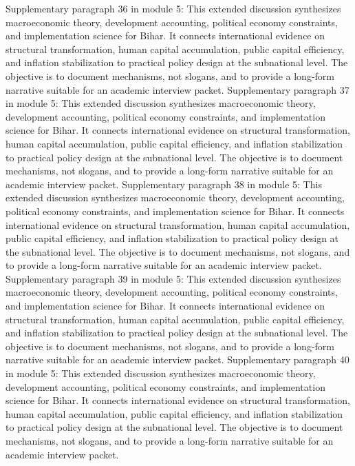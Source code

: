 \documentclass[preprint,12pt]{elsarticle}
\begin{document}
Supplementary paragraph 36 in module 5: This extended discussion synthesizes macroeconomic theory, development accounting, political economy constraints, and implementation science for Bihar. It connects international evidence on structural transformation, human capital accumulation, public capital efficiency, and inflation stabilization to practical policy design at the subnational level. The objective is to document mechanisms, not slogans, and to provide a long-form narrative suitable for an academic interview packet.
Supplementary paragraph 37 in module 5: This extended discussion synthesizes macroeconomic theory, development accounting, political economy constraints, and implementation science for Bihar. It connects international evidence on structural transformation, human capital accumulation, public capital efficiency, and inflation stabilization to practical policy design at the subnational level. The objective is to document mechanisms, not slogans, and to provide a long-form narrative suitable for an academic interview packet.
Supplementary paragraph 38 in module 5: This extended discussion synthesizes macroeconomic theory, development accounting, political economy constraints, and implementation science for Bihar. It connects international evidence on structural transformation, human capital accumulation, public capital efficiency, and inflation stabilization to practical policy design at the subnational level. The objective is to document mechanisms, not slogans, and to provide a long-form narrative suitable for an academic interview packet.
Supplementary paragraph 39 in module 5: This extended discussion synthesizes macroeconomic theory, development accounting, political economy constraints, and implementation science for Bihar. It connects international evidence on structural transformation, human capital accumulation, public capital efficiency, and inflation stabilization to practical policy design at the subnational level. The objective is to document mechanisms, not slogans, and to provide a long-form narrative suitable for an academic interview packet.
Supplementary paragraph 40 in module 5: This extended discussion synthesizes macroeconomic theory, development accounting, political economy constraints, and implementation science for Bihar. It connects international evidence on structural transformation, human capital accumulation, public capital efficiency, and inflation stabilization to practical policy design at the subnational level. The objective is to document mechanisms, not slogans, and to provide a long-form narrative suitable for an academic interview packet.
\end{document}

